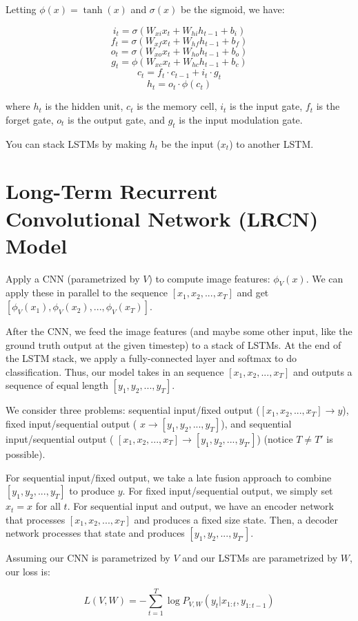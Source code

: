 \documentclass[a4paper]{article}
\begin{document}
Letting $\phi(x) = \tanh(x)$ and $\sigma(x)$ be the sigmoid, we have:

$$
i_t = \sigma(W_{xi} x_t + W_{hi} h_{t-1} + b_i)
$$
$$
f_t = \sigma(W_{xf} x_t + W_{hf} h_{t-1} + b_f)
$$
$$
o_t = \sigma(W_{xo} x_t + W_{ho} h_{t-1} + b_o)
$$
$$
g_t = \phi(W_{xc} x_t + W_{hc} h_{t-1} + b_c)
$$
$$
c_t = f_t \cdot c_{t-1} + i_t \cdot g_t
$$
$$
h_t = o_t \cdot \phi(c_t)
$$

where $h_t$ is the hidden unit, $c_t$ is the memory cell, $i_t$ is the input
gate, $f_t$ is the forget gate, $o_t$ is the output gate, and $g_t$ is the
input modulation gate.

You can stack LSTMs by making $h_t$ be the input ($x_t$) to another LSTM.

\section{Long-Term Recurrent Convolutional Network (LRCN) Model}
Apply a CNN (parametrized by $V$) to compute image features: $\phi_V(x)$.
We can apply these in parallel to the sequence $[x_1, x_2, ..., x_T]$ and get
$[\phi_V(x_1), \phi_V(x_2), ..., \phi_V(x_T)]$.

After the CNN, we feed the image features (and maybe some other input, like
the ground truth output at the given timestep) to a stack of LSTMs. At the
end of the LSTM stack, we apply a fully-connected layer and softmax to do
classification. Thus, our model takes in an sequence $[x_1, x_2, ..., x_T]$
and outputs a sequence of equal length $[y_1, y_2, ..., y_T]$.

We consider three problems: sequential input/fixed output
($[x_1, x_2, ..., x_T] \rightarrow y$), fixed input/sequential output (
$x \rightarrow [y_1, y_2, ..., y_T]$), and sequential input/sequential output (
$[x_1, x_2, ..., x_T] \rightarrow [y_1, y_2, ..., y_{T'}]$) (notice $T \ne T'$
is possible).

For sequential input/fixed output, we take a late fusion approach to combine
$[y_1, y_2, ..., y_T]$ to produce $y$. For fixed input/sequential output,
we simply set $x_t = x$ for all $t$. For sequential input and output, we have
an encoder network that processes $[x_1, x_2, ..., x_T]$ and produces a fixed
size state. Then, a decoder network processes that state and produces
$[y_1, y_2, ..., y_{T'}]$.

Assuming our CNN is parametrized by $V$ and our LSTMs are parametrized by $W$,
our loss is:

$$
L(V, W) = - \sum_{t = 1}^{T}{\log{P_{V, W}(y_t | x_{1:t}, y_{1:t-1})}}
$$
\end{document}

